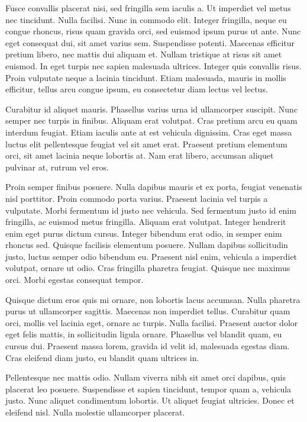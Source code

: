 \documentclass{article}
\begin{document}
	Fusce convallis placerat nisi, sed fringilla sem iaculis a. Ut imperdiet vel metus nec tincidunt. Nulla facilisi. Nunc in commodo elit. Integer fringilla, neque eu congue rhoncus, risus quam gravida orci, sed euismod ipsum purus ut ante. Nunc eget consequat dui, sit amet varius sem. Suspendisse potenti. Maecenas efficitur pretium libero, nec mattis dui aliquam et. Nullam tristique at risus sit amet euismod. In eget turpis nec sapien malesuada ultrices. Integer quis convallis risus. Proin vulputate neque a lacinia tincidunt. Etiam malesuada, mauris in mollis efficitur, tellus arcu congue ipsum, eu consectetur diam lectus vel lectus.
	
	Curabitur id aliquet mauris. Phasellus varius urna id ullamcorper suscipit. Nunc semper nec turpis in finibus. Aliquam erat volutpat. Cras pretium arcu eu quam interdum feugiat. Etiam iaculis ante at est vehicula dignissim. Cras eget massa luctus elit pellentesque feugiat vel sit amet erat. Praesent pretium elementum orci, sit amet lacinia neque lobortis at. Nam erat libero, accumsan aliquet pulvinar at, rutrum vel eros.
	
	Proin semper finibus posuere. Nulla dapibus mauris et ex porta, feugiat venenatis nisl porttitor. Proin commodo porta varius. Praesent lacinia vel turpis a vulputate. Morbi fermentum id justo nec vehicula. Sed fermentum justo id enim fringilla, ac euismod metus fringilla. Aliquam erat volutpat. Integer hendrerit enim eget purus dictum cursus. Integer bibendum erat odio, in semper enim rhoncus sed. Quisque facilisis elementum posuere. Nullam dapibus sollicitudin justo, luctus semper odio bibendum eu. Praesent nisl enim, vehicula a imperdiet volutpat, ornare ut odio. Cras fringilla pharetra feugiat. Quisque nec maximus orci. Morbi egestas consequat tempor.
	
	Quisque dictum eros quis mi ornare, non lobortis lacus accumsan. Nulla pharetra purus ut ullamcorper sagittis. Maecenas non imperdiet tellus. Curabitur quam orci, mollis vel lacinia eget, ornare ac turpis. Nulla facilisi. Praesent auctor dolor eget felis mattis, in sollicitudin ligula ornare. Phasellus vel blandit quam, eu cursus dui. Praesent massa lorem, gravida id velit id, malesuada egestas diam. Cras eleifend diam justo, eu blandit quam ultrices in.
	
	Pellentesque nec mattis odio. Nullam viverra nibh sit amet orci dapibus, quis placerat leo posuere. Suspendisse et sapien tincidunt, tempor quam a, vehicula justo. Nunc aliquet condimentum lobortis. Ut aliquet feugiat ultricies. Donec et eleifend nisl. Nulla molestie ullamcorper placerat.
	
\end{document}
